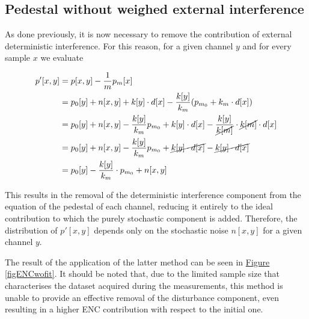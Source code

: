 \subsection{Pedestal without weighed external interference}
As done previously, it is now necessary to remove the contribution of external deterministic interference. For this reason, for a given channel $y$ and for every sample $x$ we evaluate

\begin{equation}
    \begin{split}
        p'[x,y] & = p[x,y] - \frac{1}{m} p_m[x] \\
        & = p_0[y] + n[x,y] + k[y] \cdot d[x] - \frac{k[y]}{k_m} (p_{m_0} + k_m \cdot d[x]) \\
        & = p_0[y] + n[x,y] - \frac{k[y]}{k_m} p_{m_0} + k[y] \cdot d[x] - \frac{k[y]}{\cancel{k[m]}} \cdot \cancel{k[m]} \cdot d[x] \\
        & = p_0[y] + n[x,y] - \frac{k[y]}{k_m} p_{m_0} + \cancel{k[y] \cdot d[x]} - \cancel{k[y] \cdot d[x]} \\
        & = p_0[y] - \frac{k[y]}{k_m} \cdot p_{m_0} + n[x,y]
    \end{split}
\end{equation}

\noindent
This results in the removal of the deterministic interference component from the equation of the pedestal of each channel, reducing it entirely to the ideal contribution to which the purely stochastic component is added. Therefore, the distribution of $p'[x,y]$ depends only on the stochastic noise $n[x,y]$ for a given channel $y$.

\par
The result of the application of the latter method can be seen in \hyperref[figENCwofit]{Figure \ref{figENCwofit}}. It should be noted that, due to the limited sample size that characterises the dataset acquired during the measurements, this method is unable to provide an effective removal of the disturbance component, even resulting in a higher ENC contribution with respect to the initial one.

